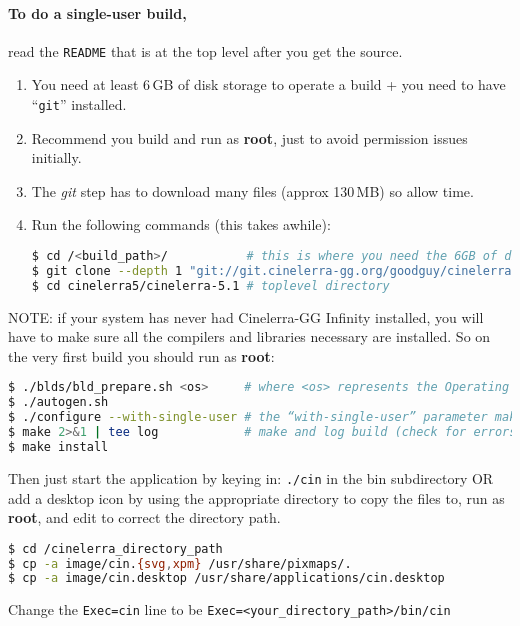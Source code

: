 \paragraph{To do a single-user build,} read the \texttt{README} that is at the top level after you get the source.
\begin{enumerate}
    \item  You need at least 6\,GB of disk storage to operate a build + you need to have  “\texttt{git}” installed.
    \item  Recommend you build and run as \textbf{root}, just to avoid permission issues initially.
    \item  The \textit{git} step has to download many files (approx 130\,MB) so allow time.
    \item  Run the following commands (this takes awhile):
        \begin{lstlisting}[language=bash,numbers=none]
$ cd /<build_path>/           # this is where you need the 6GB of disk space
$ git clone --depth 1 "git://git.cinelerra-gg.org/goodguy/cinelerra.git" cinelerra5 
$ cd cinelerra5/cinelerra-5.1 # toplevel directory
        \end{lstlisting}
\end{enumerate}

NOTE: if your system has never had Cinelerra-GG Infinity installed, you will have to make sure all
the compilers and libraries necessary are installed. So on the very first build you should run as \textbf{root}:

\begin{lstlisting}[language=bash,numbers=none]
$ ./blds/bld_prepare.sh <os>     # where <os> represents the Operating System of centos, fedora, suse, leap, ubuntu, debian.
$ ./autogen.sh
$ ./configure --with-single-user # the “with-single-user” parameter makes it so
$ make 2>&1 | tee log            # make and log build (check for errors before proceeding)
$ make install
\end{lstlisting}

Then just start the application by keying in: \texttt{./cin} in the bin subdirectory OR add a desktop icon by
using the appropriate directory to copy the files to, run as \textbf{root}, and edit to correct the directory path.

\begin{lstlisting}[language=bash,numbers=none]
$ cd /cinelerra_directory_path
$ cp -a image/cin.{svg,xpm} /usr/share/pixmaps/.
$ cp -a image/cin.desktop /usr/share/applications/cin.desktop
\end{lstlisting}
Change the \texttt{Exec=cin} line to be \texttt{Exec=<your\_directory\_path>/bin/cin}

